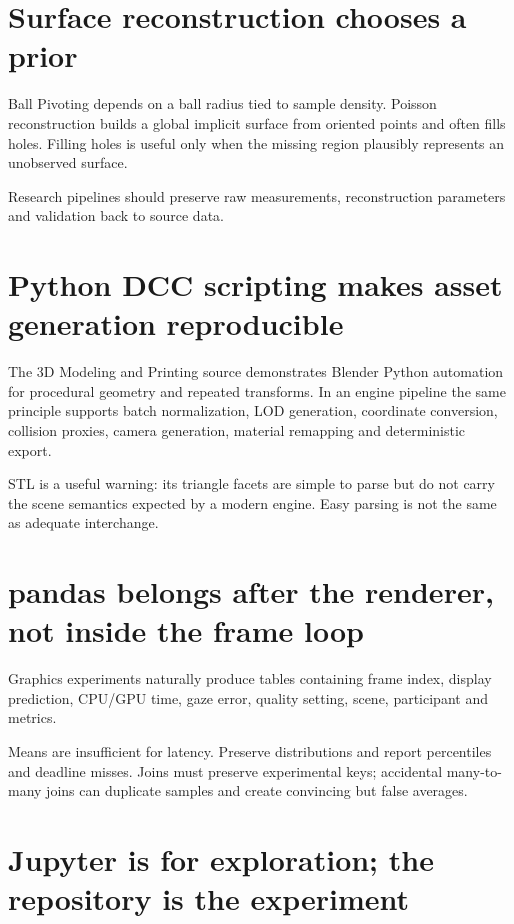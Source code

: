 \section{Surface reconstruction chooses a prior}\label{04-visual-computing-ii-ch035-surface-reconstruction-chooses-a-prior}

Ball Pivoting depends on a ball radius tied to sample density. Poisson reconstruction builds a global implicit surface from oriented points and often fills holes. Filling holes is useful only when the missing region plausibly represents an unobserved surface.

Research pipelines should preserve raw measurements, reconstruction parameters and validation back to source data.

\section{Python DCC scripting makes asset generation reproducible}\label{04-visual-computing-ii-ch035-python-dcc-scripting-makes-asset-generation-reproducible}

The 3D Modeling and Printing source demonstrates Blender Python automation for procedural geometry and repeated transforms. In an engine pipeline the same principle supports batch normalization, LOD generation, coordinate conversion, collision proxies, camera generation, material remapping and deterministic export.

STL is a useful warning: its triangle facets are simple to parse but do not carry the scene semantics expected by a modern engine. Easy parsing is not the same as adequate interchange.

\section{pandas belongs after the renderer, not inside the frame loop}\label{04-visual-computing-ii-ch035-pandas-belongs-after-the-renderer-not-inside-the-frame-loop}

Graphics experiments naturally produce tables containing frame index, display prediction, CPU/GPU time, gaze error, quality setting, scene, participant and metrics.

Means are insufficient for latency. Preserve distributions and report percentiles and deadline misses. Joins must preserve experimental keys; accidental many-to-many joins can duplicate samples and create convincing but false averages.

\section{Jupyter is for exploration; the repository is the experiment}\label{04-visual-computing-ii-ch035-jupyter-is-for-exploration-the-repository-is-the-experiment}

